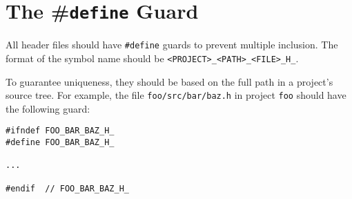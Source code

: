 
\section{The \texorpdfstring{\colorbox{code_bg_pro}{\#}\texttt{define}}{} Guard}\label{sec:the-define-guard}
All header files should have \texttt{#define} guards to prevent multiple inclusion. The format of the symbol name should be \texttt{<PROJECT>_<PATH>_<FILE>_H_}.

To guarantee uniqueness, they should be based on the full path in a project's source tree. For example, the file \texttt{foo/src/bar/baz.h} in project \texttt{foo} should have the following guard:
\begin{verbatim}
#ifndef FOO_BAR_BAZ_H_
#define FOO_BAR_BAZ_H_

...

#endif  // FOO_BAR_BAZ_H_
\end{verbatim}

